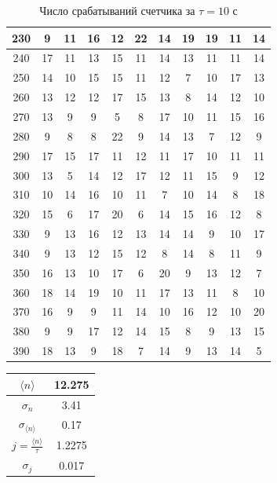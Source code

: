 \documentclass[a4paper, 12pt]{article}
\begin{document}
\begin{table}[!h]
\begin{center}
\begin{tabular}{|c|c|c|c|c|c|c|c|c|c|c|}
230 & 9  & 11 & 16 & 12 & 22 & 14 & 19 & 19 & 11 & 14 \\ \hline
240 & 17 & 11 & 13 & 15 & 11 & 14 & 13 & 11 & 11 & 14 \\ \hline 
250 & 14 & 10 & 15 & 15 & 11 & 12 & 7  & 10 & 17 & 13 \\ \hline
260 & 13 & 12 & 12 & 17 & 15 & 13 & 8  & 14 & 12 & 10 \\ \hline
270 & 13 & 9  & 9  & 5  & 8  & 17 & 10 & 11 & 15 & 16 \\ \hline
280 & 9  & 8  & 8  & 22 & 9  & 14 & 13 & 7  & 12 & 9  \\ \hline
290 & 17 & 15 & 17 & 11 & 12 & 11 & 17 & 10 & 11 & 11 \\ \hline
300 & 13 & 5  & 14 & 12 & 17 & 12 & 11 & 15 & 9  & 12 \\ \hline
310 & 10 & 14 & 16 & 10 & 11 & 7  & 10 & 14 & 8  & 18 \\ \hline
320 & 15 & 6  & 17 & 20 & 6  & 14 & 15 & 16 & 12 & 8  \\ \hline
330 & 9  & 13 & 16 & 12 & 13 & 14 & 14 & 9  & 10 & 17 \\ \hline
340 & 9  & 13 & 12 & 15 & 12 & 8  & 14 & 8  & 11 & 9  \\ \hline
350 & 16 & 13 & 10 & 17 & 6  & 20 & 9  & 13 & 12 & 7  \\ \hline
360 & 18 & 14 & 19 & 10 & 11 & 17 & 13 & 11 & 8  & 10 \\ \hline
370 & 16 & 9  & 9  & 11 & 14 & 10 & 16 & 12 & 10 & 20 \\ \hline
380 & 9  & 9  & 17 & 12 & 14 & 15 & 8  & 9  & 13 & 15 \\ \hline
390 & 18 & 13 & 9  & 18 & 7  & 14 & 9  & 13 & 14 & 5  \\ \hline
\end{tabular}
\caption*{Число срабатываний счетчика за $\tau = 10$ с}
\end{center}
\end{table}

\begin{table}[!h]
\begin{center}
\begin{tabular}{|c|c|}
\hline
$\langle n\rangle$ & 12.275 \\ \hline
$\sigma_{n}$ & 3.41 \\ \hline
$\sigma_{\langle n\rangle}$ & 0.17 \\ \hline
$j=\frac{\langle n\rangle}{\tau}$ & 1.2275 \\ \hline
$\sigma_{j}$ & 0.017 \\ \hline
\end{tabular}
\end{center}
\end{table}
\end{document}
